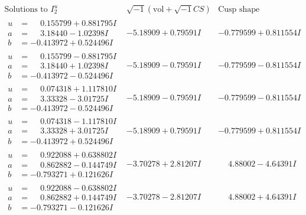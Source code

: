 \documentclass[1p]{elsarticle_modified}
\theoremstyle{definition}
\newcommand{\I}{\sqrt{-1}}
\begin{document}
$$\begin{array}{c|c|c}  
\text{Solutions to }I^u_{2}& \I (\text{vol} + \sqrt{-1}CS) & \text{Cusp shape}\\
 \hline 
\begin{aligned}
u &= \phantom{-}0.155799 + 0.881795 I \\
a &= \phantom{-}3.18440 - 1.02398 I \\
b &= -0.413972 + 0.524496 I\end{aligned}
 & -5.18909 + 0.79591 I & -0.779599 + 0.811554 I \\ \hline\begin{aligned}
u &= \phantom{-}0.155799 - 0.881795 I \\
a &= \phantom{-}3.18440 + 1.02398 I \\
b &= -0.413972 - 0.524496 I\end{aligned}
 & -5.18909 - 0.79591 I & -0.779599 - 0.811554 I \\ \hline\begin{aligned}
u &= \phantom{-}0.074318 + 1.117810 I \\
a &= \phantom{-}3.33328 - 3.01725 I \\
b &= -0.413972 - 0.524496 I\end{aligned}
 & -5.18909 - 0.79591 I & -0.779599 - 0.811554 I \\ \hline\begin{aligned}
u &= \phantom{-}0.074318 - 1.117810 I \\
a &= \phantom{-}3.33328 + 3.01725 I \\
b &= -0.413972 + 0.524496 I\end{aligned}
 & -5.18909 + 0.79591 I & -0.779599 + 0.811554 I \\ \hline\begin{aligned}
u &= \phantom{-}0.922088 + 0.638802 I \\
a &= \phantom{-}0.862882 - 0.144749 I \\
b &= -0.793271 + 0.121626 I\end{aligned}
 & -3.70278 + 2.81207 I & \phantom{-}4.88002 - 4.64391 I \\ \hline\begin{aligned}
u &= \phantom{-}0.922088 - 0.638802 I \\
a &= \phantom{-}0.862882 + 0.144749 I \\
b &= -0.793271 - 0.121626 I\end{aligned}
 & -3.70278 - 2.81207 I & \phantom{-}4.88002 + 4.64391 I \\ \hline\begin{aligned}

\end{aligned}
\end{array}$$
\end{document}
